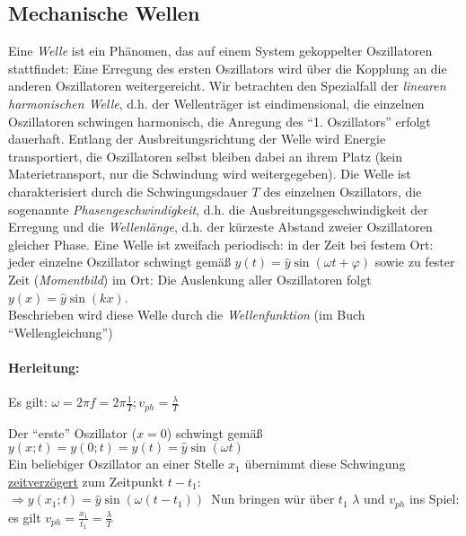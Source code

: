 \documentclass[a4paper]{scrartcl}
\begin{document}
\subsection{Mechanische Wellen}
Eine \emph{Welle} ist ein Phänomen, das auf einem System gekoppelter
Oszillatoren stattfindet: Eine Erregung des ersten Oszillators wird über die
Kopplung an die anderen Oszillatoren weitergereicht. Wir betrachten den
Spezialfall der \emph{linearen harmonischen Welle}, d.h. der Wellenträger ist
eindimensional, die einzelnen Oszillatoren schwingen harmonisch, die Anregung
des "`1. Oszillators"' erfolgt dauerhaft. Entlang der Ausbreitungsrichtung der
Welle wird Energie transportiert, die Oszillatoren selbst bleiben dabei an
ihrem Platz (kein Materietransport, nur die Schwindung wird weitergegeben). Die
Welle ist charakterisiert durch die Schwingungsdauer \(T\) des einzelnen
Oszillators, die sogenannte \emph{Phasengeschwindigkeit}, d.h. die
Ausbreitungsgeschwindigkeit der Erregung und die \emph{Wellenlänge}, d.h. der
kürzeste Abstand zweier Oszillatoren gleicher Phase. Eine Welle ist zweifach
periodisch: in der Zeit bei festem Ort: jeder einzelne Oszillator schwingt
gemäß \(y(t) = \hat{y} \sin(\omega t + \varphi)\) sowie zu fester Zeit
(\emph{Momentbild}) im Ort: Die Auslenkung aller Oszillatoren folgt \(y(x) =
\hat{y} \sin(kx)\).\\
Beschrieben wird diese Welle durch die \emph{Wellenfunktion} (im Buch
"`Wellengleichung"')

\paragraph{Herleitung:} Es gilt: \(\omega = 2 \pi f = 2 \pi \frac{1}{T}; v_{ph}
= \frac{\lambda}{T} \)

Der "`erste"' Oszillator (\(x=0\)) schwingt gemäß \(y(x;t) = y(0;t) = y(t) =
\hat{y} \sin(\omega t)\)\\
Ein beliebiger Oszillator an einer Stelle \(x_1\) übernimmt diese Schwingung
\underline{zeitverzögert} zum Zeitpunkt \(t-t_1\):\\
\(\Rightarrow y(x_1;t) = \hat{y} \sin(\omega (t-t_1))\)\, Nun bringen wür über
\(t_1\) \(\lambda\) und \(v_{ph}\) ins Spiel: es gilt \(v_{ph} =
\frac{x_1}{t_1} = \frac{\lambda}{T}\)
\end{document}
